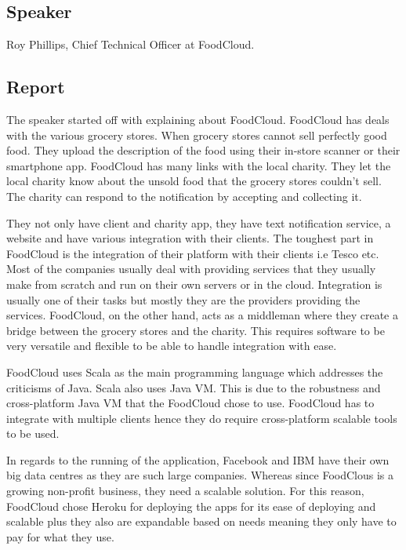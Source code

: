 \subsection{Speaker}

Roy Phillips, Chief Technical Officer at FoodCloud.

\subsection{Report}

The speaker started off with explaining about FoodCloud. FoodCloud has deals with the various grocery stores. When grocery stores cannot sell perfectly good food. They upload the description of the food using their in-store scanner or their smartphone app. FoodCloud has many links with the local charity. They let the local charity know about the unsold food that the grocery stores couldn't sell. The charity can respond to the notification by accepting and collecting it.

They not only have client and charity app, they have text notification service, a website and have various integration with their clients. The toughest part in FoodCloud is the integration of their platform with their clients i.e Tesco etc. Most of the companies usually deal with providing services that they usually make from scratch and run on their own servers or in the cloud. Integration is usually one of their tasks but mostly they are the providers providing the services. FoodCloud, on the other hand, acts as a middleman where they create a bridge between the grocery stores and the charity. This requires software to be very versatile and flexible to be able to handle integration with ease.

FoodCloud uses Scala as the main programming language which addresses the criticisms of Java. Scala also uses Java VM. This is due to the robustness and cross-platform Java VM that the FoodCloud chose to use. FoodCloud has to integrate with multiple clients hence they do require cross-platform scalable tools to be used.

In regards to the running of the application, Facebook and IBM have their own big data centres as they are such large companies. Whereas since FoodClous is a growing non-profit business, they need a scalable solution. For this reason, FoodCloud chose Heroku for deploying the apps for its ease of deploying and scalable plus they also are expandable based on needs meaning they only have to pay for what they use.

